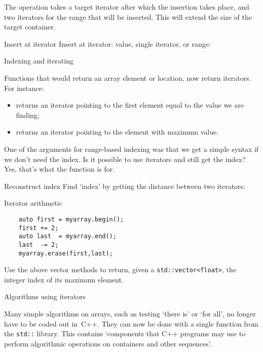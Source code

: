 The  operation takes a target iterator
after which the insertion takes place, and
two iterators for the range that will be inserted.
This will extend the size of the target container.

\begin{block}{Insert at iterator}
  \label{sl:iter-insert}
  Insert at iterator: value, single iterator, or range:
\end{block}

 {Indexing and iterating}

Functions that would return an array element or location,
now return iterators. For instance:
\begin{itemize}
\item {} returns an iterator pointing to the first element
  equal to the value we are finding;
\item {} returns an iterator pointing to the
  element with maximum value.
\end{itemize}

One of the arguments for range-based indexing was
that we get a simple syntax if we don't need the index.
Is it possible to use iterators and still get the index?
Yes, that's what the function  is for.

\begin{block}{Reconstruct index}
  \label{sl:iterator-distance}
  Find `index' by getting the distance between
  two iterators:
\end{block}

\begin{slide}{Iterator arithmetic}
  \label{sl:iterator-arithmetic}
  \begin{lstlisting}
    auto first = myarray.begin();
    first += 2;
    auto last  = myarray.end();
    last  -= 2;
    myarray.erase(first,last);
  \end{lstlisting}
\end{slide}

\begin{exercise}
  Use the above vector methods to return,
  given a \lstinline+std::vector<float>+,
  the integer index of its maximum element.
\end{exercise}

 {Algorithms using iterators}
\label{sec:algorithm}

Many simple algorithms on arrays, such as testing `there is' or `for all',
no longer have to be coded out in~C++.
They can now be done with a single
function from the \lstinline{std::} library.
This contains `components that C++ programs may use to perform
algorithmic operations on containers and other sequences'.

